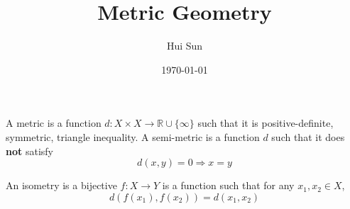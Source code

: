 \documentclass[openany]{book}
\title{Metric Geometry}
\date{\today}
\author{Hui Sun}
\newcommand{\R}{\mathbb{R}}
\begin{document}
\maketitle

\tableofcontents


A metric is a function $d: X\times X\to\R\cup\{\infty\}$ such that it is positive-definite, symmetric, triangle inequality. A semi-metric is a function $d$ such that it does \textbf{not} satisfy
\begin{equation*}
    d(x,y)=0\Rightarrow x=y
\end{equation*}

\begin{defn}[isometry]
    An isometry is a bijective $f:X\to Y$ is a function such that for any $x_1, x_2\in X$,
    \begin{equation*}
        d(f(x_1), f(x_2))=d(x_1, x_2)
    \end{equation*}
\end{defn}






\newpage
\end{document}

